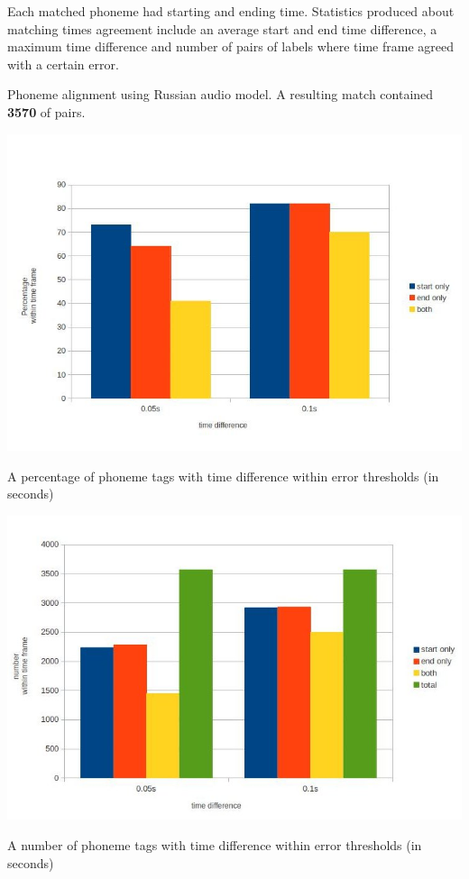 \documentclass[12pt,a4paper,english]{article}
\begin{document}
Each matched phoneme had starting and ending time. Statistics produced about matching times agreement include an average start and end time difference, a maximum time difference and number of pairs of labels where time frame agreed with a certain error.

\newpage
Phoneme alignment using Russian audio model. \newline
A resulting match contained \textbf{3570} of pairs.
\begin{center}
    \includegraphics[scale=0.4]{corpora_phoneme_russian_results.jpg}
    \caption[]{A percentage of phoneme tags with time difference within error thresholds (in seconds)}
\end{center}
\begin{center}
    \includegraphics[scale=0.4]{corpora_phoneme_russian_counts.jpg}
    \caption[]{A number of phoneme tags with time difference within error thresholds (in seconds)}
\end{center}
\end{document}
